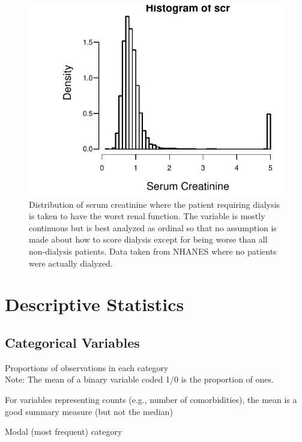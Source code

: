 \begin{Schunk}
\begin{figure}[htbp]

\centerline{\includegraphics{descript-ordc-1} }

\caption[Continuous distribution with clumping at the end]{Distribution of serum creatinine where the patient requiring dialysis is taken to have the worst renal function.  The variable is mostly continuous but is best analyzed as ordinal so that no assumption is made about how to score dialysis except for being worse than all non-dialysis patients. Data taken from NHANES where no patients were actually dialyzed.}\label{fig:descript-ordc}
\end{figure}
\end{Schunk}
\clearpage
\section{Descriptive Statistics}    
\subsection{Categorical Variables}
\bi
\item Proportions of observations in each category \\
  Note: The mean of a binary variable coded 1/0 is the proportion of
  ones.
\item For variables representing counts (e.g., number of
  comorbidities), the mean is a good summary measure (but not the median)
\item Modal (most frequent) category
\ei

